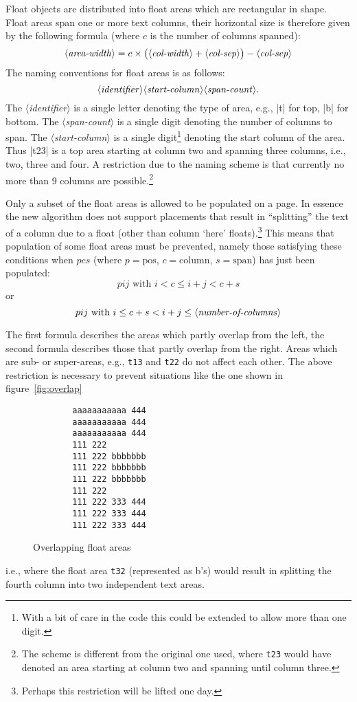 \documentclass[twocolumn]{article}
\newcommand\meta[1]{\mbox{$\langle$\textit{#1}$\rangle$}}
\begin{document}
Float objects are distributed into float areas which are
rectangular in shape. Float areas span one or more text columns, their
horizontal size is therefore given by the following formula (where
$c$ is the number of columns spanned):
\[
   \meta{area-width} =  c \times 
                        \bigl( \meta{col-width} + \meta{col-sep}\bigr)
                        - \meta{col-sep}
\]
The naming conventions for float areas is as follows:
\[
\meta{identifier}\meta{start-column}\meta{span-count}.
\]
The \meta{identifier} is a single letter denoting the type of area,
e.g., |t| for top, |b| for bottom. The \meta{span-count} is a single
digit denoting the number of columns to span. The
\meta{start-column} is a single digit\footnote{With a bit of care in
the code this could be extended to allow more than one digit.}
denoting the start column of the area. Thus |t23| is a top area
starting at column two and spanning three columns, i.e., two, three 
and four.
A restriction due to the naming scheme is that currently no more than
9 columns are possible.\footnote{The scheme is different from the
original one used, where \texttt{t23} would have denoted an area
starting at column two and spanning until column three.}

Only a subset of the float areas is allowed to be populated on a
page. In essence the new algorithm does not support placements
that result in ``splitting'' the text of a column due to a float (other
than column `here' floats).\footnote{Perhaps this restriction will be
lifted one day.} This means that population of some float areas
must be prevented, namely those satisfying these conditions
when $pcs$ (where $p=\textrm{pos}$, 
$c=\textrm{column}$, $s=\textrm{span}$) has just been populated:
\[
   pij  \textrm{ with }   i < c \leq i+j < c+s
\]
or
\[
   pij  \textrm{ with }   i \leq c+s < i+j \leq 
                            \mbox{\meta{number-of-columns}}
\]


The first formula describes the areas which partly overlap from the
left, the second formula describes those that partly overlap from
the right. Areas which are sub- or super-areas, e.g., \texttt{t13}
and \texttt{t22} do not affect each other. The above restriction is
necessary to prevent situations like the one shown in
figure~\vref{fig:overlap}
%
\begin{figure}
\footnotesize
\caption{Overlapping float areas}\label{fig:overlap}
\begin{minipage}{.6\columnwidth}
\begin{verbatim}
        aaaaaaaaaaa 444
        aaaaaaaaaaa 444
        aaaaaaaaaaa 444
        111 222
        111 222 bbbbbbb
        111 222 bbbbbbb
        111 222 bbbbbbb
        111 222
        111 222 333 444
        111 222 333 444
        111 222 333 444
\end{verbatim}
\end{minipage}
\end{figure}
%
i.e., where the float area \texttt{t32} (represented as b's) would
result in splitting the fourth column into two independent text areas.
\end{document}
